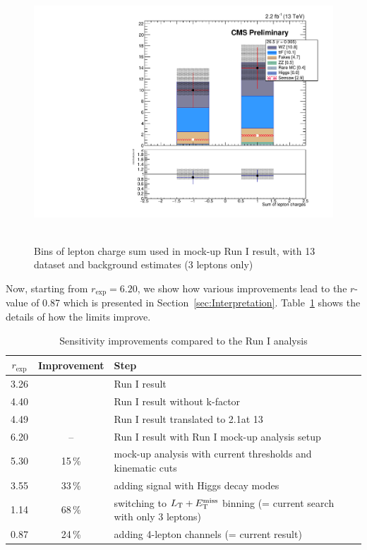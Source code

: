 \begin{figure}[h]
\begin{center}
	\includegraphics[width=.7\textwidth]{Appendix/L3Tau0_Q}\
	\caption{Bins of lepton charge sum used in mock-up Run I result, with 13\,\TeV dataset and background estimates (3 leptons only)
	\label{fig:app:RunI}}
\end{center}
\end{figure}

Now, starting from $r_\textrm{exp} = 6.20$, we show how various improvements lead to the $r$-value of 0.87 which is presented in Section~\ref{sec:Interpretation}. Table~\ref{tab:improvements} shows the details of how the limits improve.

\begin{table}[h]
\centering
\caption{Sensitivity improvements compared to the Run I analysis} \label{tab:improvements}
\begin{tabular}{c c l}
\hline\hline
$r_\textrm{exp}$ & Improvement & Step \\
\hline
\hline
3.26 & & Run I result \\
4.40 & & Run I result without k-factor \\
4.49 & & Run I result translated to 2.1\fbinv at 13\,\TeV\\
\hline
6.20 & -- & Run I result with Run I mock-up analysis setup \\
5.30 & 15\,\% & mock-up analysis with current \pt thresholds and kinematic cuts \\
3.55 & 33\,\% & adding signal with Higgs decay modes \\
1.14 & 68\,\% & switching to $L_\textrm{T} + E_{\mathrm{T}}^{\text{miss}}$ binning (= current search with only 3 leptons) \\
0.87 & 24\,\% & adding 4-lepton channels (= current result) \\
\end{tabular}
\end{table}
